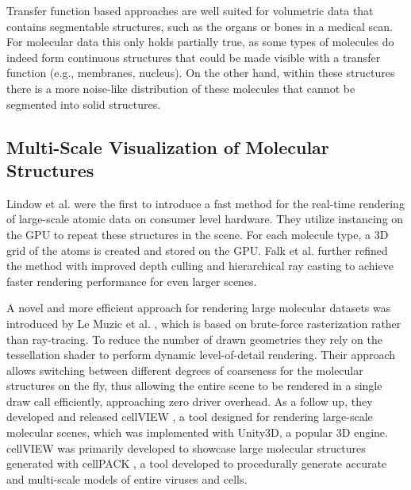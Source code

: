 \pagebreak

Transfer function based approaches are well suited for volumetric data that contains segmentable structures, such as the organs or bones in a medical scan. For molecular data this only holds partially true, as some types of molecules do indeed form continuous structures that could be made visible with a transfer function (e.g., membranes, nucleus). On the other hand, within these structures there is a more noise-like distribution of these molecules that cannot be segmented into solid structures.

\subsection{Multi-Scale Visualization of Molecular Structures}
Lindow et al. \cite{lindow15} were the first to introduce a fast method for the real-time rendering of large-scale atomic data on consumer level hardware. They utilize instancing on the GPU to repeat these structures in the scene. For each molecule type, a 3D grid of the atoms is created and stored on the GPU. Falk et al. \cite{falk13} further refined the method with improved depth culling and hierarchical ray casting to achieve faster rendering performance for even larger scenes. 

A novel and more efficient approach for rendering large molecular datasets was introduced by Le Muzic et al. \cite{le2014illustrative}, which is based on brute-force rasterization rather than ray-tracing. 
To reduce the number of drawn geometries they rely on the tessellation shader to perform dynamic level-of-detail rendering. 
Their approach allows switching between different degrees of coarseness for the molecular structures on the fly, thus allowing the entire scene to be rendered in a single draw call efficiently, approaching zero driver overhead. 
As a follow up, they developed and released cellVIEW \cite{muzic15}, a tool designed for rendering large-scale molecular scenes, which was implemented with Unity3D, a popular 3D engine.
cellVIEW was primarily developed to showcase large molecular structures generated with cellPACK \cite{cellpack}, a tool developed to procedurally generate accurate and multi-scale models of entire viruses and cells.

